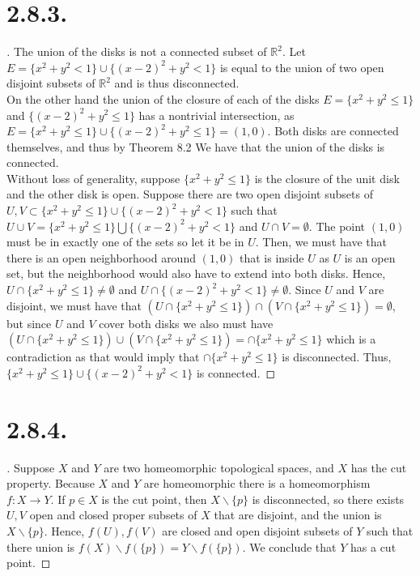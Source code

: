 \documentclass{article}
\begin{document}
\section*{2.8.3.}
\begin{proof}[\unskip\nopunct]
The union of the disks is not a connected subset of $\mathbb{R}^2$. Let $E = \{x^2 + y^2 < 1\} \cup \{(x - 2)^2 + y^2 < 1\}$ is equal to the union of two open disjoint subsets of $\mathbb{R}^2$ and is thus disconnected. \\
On the other hand the union of the closure of each of the disks $E = \{x^2 + y^2 \leq 1\}$ and $\{(x - 2)^2 + y^2 \leq 1\}$ has a nontrivial intersection, as $E = \{x^2 + y^2 \leq 1\} \cup \{(x - 2)^2 + y^2 \leq 1\} = (1, 0)$. 
Both disks are connected themselves, and thus by Theorem 8.2
We have that the union of the disks is connected. \\
Without loss of generality, suppose $\{x^2 + y^2 \leq 1\}$ is the closure of the unit disk and the other disk is open. Suppose there are two open disjoint subsets of $U, V \subset \{x^2 + y^2 \leq 1\} \cup \{(x - 2)^2 + y^2 < 1\}$
such that $U \cup V =\{x^2 + y^2 \leq 1\} \bigcup \{(x - 2)^2 + y^2 < 1\}$ and $U \cap V = \emptyset$. The point $(1, 0)$ must be in exactly one of the sets so let it be in $U$. Then, we must have that there is an open neighborhood around $(1, 0)$ that is inside $U$ as $U$ is an open set, but the neighborhood would also have to extend into both disks. Hence, $U \cap\{x^2 + y^2 \leq 1\} \neq \emptyset$ and $U \cap \{(x - 2)^2 + y^2 < 1\} \neq \emptyset$. Since $U$ and $V$ are 
disjoint, we must have that $(U \cap\{x^2 + y^2 \leq 1\}) \cap (V \cap\{x^2 + y^2 \leq 1\}) = \emptyset$, but since $U$ and $V$ cover both disks we also must have $(U \cap\{x^2 + y^2 \leq 1\}) \cup (V \cap\{x^2 + y^2 \leq 1\}) =\cap\{x^2 + y^2 \leq 1\} $ which is a contradiction 
as that would imply that $\cap\{x^2 + y^2 \leq 1\}$ is disconnected. Thus, 
$ \{x^2 + y^2 \leq 1\} \cup \{(x - 2)^2 + y^2 < 1\}$ is connected. 


\end{proof}
\section*{2.8.4.}
\begin{proof}[\unskip\nopunct]
Suppose $X$ and $Y$ are two homeomorphic topological spaces, and $X$ has the cut property. Because $X$ and $Y$ are homeomorphic there is a homeomorphism $f:X \to Y$. If $p \in X$ is the cut point, then $X\backslash \{p\}$ is disconnected, so there exists $U, V$ open and closed proper subsets of $X$ that are disjoint, and the union is $X\backslash \{p\}$. Hence, $f(U), f(V)$ are closed and open disjoint subsets of $Y$ such that there union is $f(X)\backslash f(\{p\}) = Y \backslash f(\{p\})$. We conclude that $Y$ has a cut point. 
\end{proof}
\end{document}
